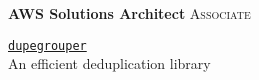 \documentclass[a4paper]{limecv}
\begin{document}
\begin{cvSidebar}
    \begin{cvCertifications}
      \begin{flushleft}
      \textbf{AWS Solutions Architect} \textsc{Associate}\\
    \end{flushleft}
    \end{cvCertifications}

    \begin{cvProjects}
      \begin{flushleft}
      \href{https://pypi.org/project/dupegrouper/}{\texttt{dupegrouper}}\\
      An efficient deduplication library
      \end{flushleft}
    \end{cvProjects}

    
  \end{cvSidebar}
\end{document}
